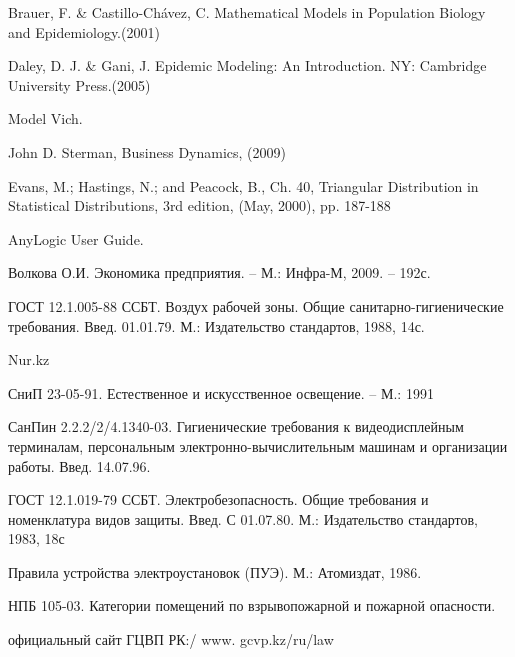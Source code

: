 \begin{thebibliography}{99}
Brauer, F. \& Castillo-Chávez, C. Mathematical Models in Population Biology and Epidemiology.(2001)

Daley, D. J. \& Gani, J. Epidemic Modeling: An Introduction. NY: Cambridge University Press.(2005)

Model Vich.

John D. Sterman, Business Dynamics, (2009)

Evans, M.; Hastings, N.; and Peacock, B., Ch. 40, Triangular Distribution in Statistical Distributions, 3rd edition, (May, 2000), pp. 187-188

AnyLogic User Guide.

Волкова О.И. Экономика предприятия. – М.: Инфра-М, 2009. – 192с.

ГОСТ 12.1.005-88 ССБТ. Воздух рабочей зоны. Общие санитарно-гигиенические требования. Введ. 01.01.79. М.: Издательство стандартов, 1988, 14с.

Nur.kz

СниП 23-05-91. Естественное и искусственное освещение. – М.: 1991

СанПин 2.2.2/2/4.1340-03. Гигиенические требования  к видеодисплейным терминалам, персональным электронно-вычислительным машинам и организации работы. Введ. 14.07.96.

ГОСТ 12.1.019-79 ССБТ. Электробезопасность. Общие требования и номенклатура видов защиты. Введ. С 01.07.80. М.: Издательство стандартов, 1983, 18с

Правила устройства электроустановок (ПУЭ). М.: Атомиздат, 1986.

НПБ 105-03. Категории помещений по взрывопожарной и пожарной опасности.

официальный сайт ГЦВП РК:/ www. gcvp.kz/ru/law

\end{thebibliography}


